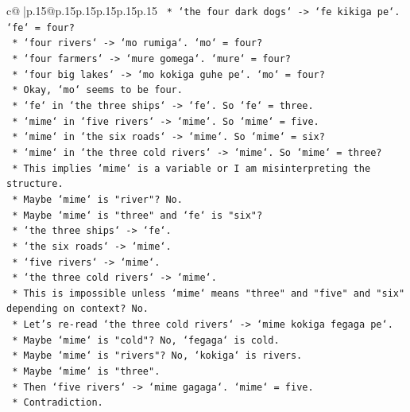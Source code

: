 \documentclass{article}
\begin{document}
{\begin{supertabular}{c@{$\;$}|p{.15\linewidth}@{}p{.15\linewidth}p{.15\linewidth}p{.15\linewidth}p{.15\linewidth}p{.15\linewidth}}
{{{\texttt{            *   `the four dark dogs` {-}> `fe kikiga pe`. `fe` = four?} \\
\texttt{            *   `four rivers` {-}> `mo rumiga`. `mo` = four?} \\
\texttt{            *   `four farmers` {-}> `mure gomega`. `mure` = four?} \\
\texttt{            *   `four big lakes` {-}> `mo kokiga guhe pe`. `mo` = four?} \\
\texttt{            *   Okay, `mo` seems to be four.} \\
\texttt{            *   `fe` in `the three ships` {-}> `fe`. So `fe` = three.} \\
\texttt{            *   `mime` in `five rivers` {-}> `mime`. So `mime` = five.} \\
\texttt{            *   `mime` in `the six roads` {-}> `mime`. So `mime` = six?} \\
\texttt{            *   `mime` in `the three cold rivers` {-}> `mime`. So `mime` = three?} \\
\texttt{            *   This implies `mime` is a variable or I am misinterpreting the structure.} \\
\texttt{            *   Maybe `mime` is "river"? No.} \\
\texttt{            *   Maybe `mime` is "three" and `fe` is "six"?} \\
\texttt{            *   `the three ships` {-}> `fe`.} \\
\texttt{            *   `the six roads` {-}> `mime`.} \\
\texttt{            *   `five rivers` {-}> `mime`.} \\
\texttt{            *   `the three cold rivers` {-}> `mime`.} \\
\texttt{            *   This is impossible unless `mime` means "three" and "five" and "six" depending on context? No.} \\
\texttt{            *   Let's re{-}read `the three cold rivers` {-}> `mime kokiga fegaga pe`.} \\
\texttt{            *   Maybe `mime` is "cold"? No, `fegaga` is cold.} \\
\texttt{            *   Maybe `mime` is "rivers"? No, `kokiga` is rivers.} \\
\texttt{            *   Maybe `mime` is "three".} \\
\texttt{            *   Then `five rivers` {-}> `mime gagaga`. `mime` = five.} \\
\texttt{            *   Contradiction.} \\
}}}
\end{supertabular}}
\end{document}
